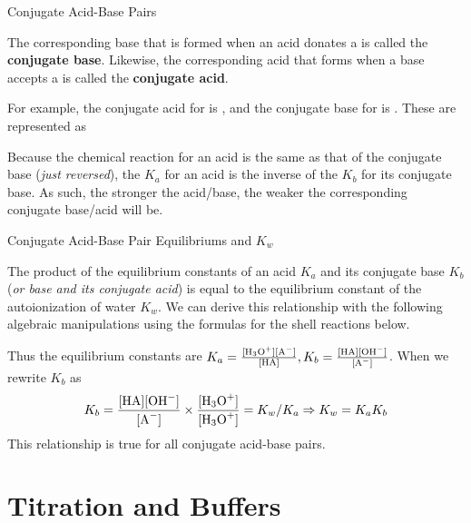 \documentclass[10pt]{article}
\begin{document}
  \begin{definition}{Conjugate Acid-Base Pairs}

    The corresponding base that is formed when an acid donates a  is called the \textbf{conjugate base}. Likewise, the corresponding acid that forms when a base accepts a  is called the \textbf{conjugate acid}.

    For example, the conjugate acid for  is , and the conjugate base for  is . These are represented as



    Because the chemical reaction for an acid is the same as that of the conjugate base (\textit{just reversed}), the $K_a$ for an acid is the inverse of the $K_b$ for its conjugate base. As such, the stronger the acid/base, the weaker the corresponding conjugate base/acid will be.  
    
  \end{definition}

  \begin{core}{Conjugate Acid-Base Pair Equilibriums and $K_w$}

    The product of the equilibrium constants of an acid $K_a$ and its conjugate base $K_b$ (\textit{or base and its conjugate acid}) is equal to the equilibrium constant of the autoionization of water $K_w$. We can derive this relationship with the following algebraic manipulations using the formulas for the shell reactions below.



    Thus the equilibrium constants are $K_{a} = \frac{[\ce{H3O^+}][\ce{A-}]}{[\ce{HA}]} , K_{b} = \frac{[\ce{HA}][\ce{OH-}]}{[\ce{A-}]}$. When we rewrite $K_b$ as
    \[
      K_{b} = \frac{[\ce{HA}][\ce{OH-}]}{[\ce{A-}]} \times \frac{[\ce{H3O+}]}{[\ce{H3O+}]} = K_w/K_a \Rightarrow K_w = K_a K_b
    \]
    This relationship is true for all conjugate acid-base pairs. 
     
  \end{core}

\section{Titration and Buffers}
\end{document}
